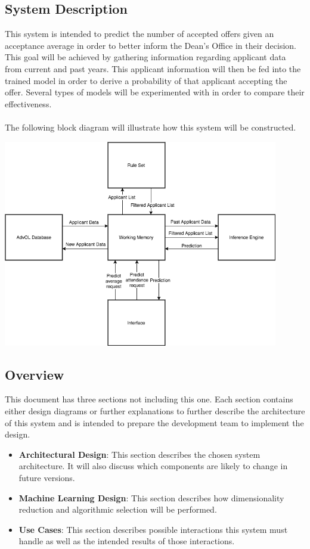 \documentclass[titlepage]{article}
\begin{document}
\subsection{System Description}
This system is intended to predict the number of accepted offers given an acceptance average in order to better inform the Dean's Office in their decision. This goal will be achieved by gathering information regarding applicant data from current and past years. This applicant information will then be fed into the trained model in order to derive a probability of that applicant accepting the offer. Several types of models will be experimented with in order to compare their effectiveness.\\~\\
The following block diagram will illustrate how this system will be constructed.\vfill
\begin{center}
	\includegraphics[width=0.9\textwidth]{AdvolBlockDiagram.png}
\label{fig:block diagram}
\end{center}
\subsection{Overview}
This document has three sections not including this one. Each section contains either design diagrams or further explanations to further describe the architecture of this system and is intended to prepare the development team to implement the design.\\
\begin{itemize}
	\item \textbf{Architectural Design}: This section describes the chosen system architecture. It will also discuss which components are likely to change in future versions.\\
	\item \textbf{Machine Learning Design}: This section describes how dimensionality reduction and algorithmic selection will be performed.\\
	\item \textbf{Use Cases}: This section describes possible interactions this system must handle as well as the intended results of those interactions.\\
\end{itemize}
\end{document}
